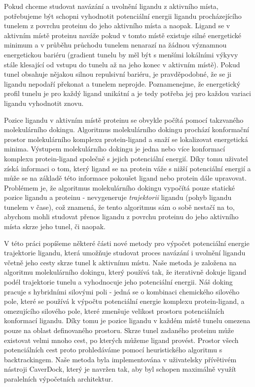 Pokud chceme studovat navázání a uvolnění ligandu z aktivního místa, potřebujeme
být schopni vyhodnotit potenciální energii ligandu procházejícího tunelem
z povrchu proteinu do jeho aktivního místa a naopak. Ligand se v aktivním
místě proteinu naváže pokud v tomto místě existuje silné energetické minimum
a v průběhu průchodu tunelem nenarazí na žádnou významnou energetickou bariéru
(gradient tunelu by měl být s menšími lokálními výkyvy stále klesající od
vstupu do tunelu až na jeho konec v aktivním místě). Pokud tunel obsahuje nějakou
silnou repulsivní bariéru, je pravděpodobné, že se ji ligandu nepodaří překonat
a tunelem neprojde. Poznamenejme, že energetický profil tunelu je pro každý
ligand unikátní a je tedy potřeba jej pro každou variaci ligandu vyhodnotit
znovu.

Pozice ligandu v aktivním místě proteinu se obvykle počítá pomocí takzvaného
molekulárního dokingu. Algoritmus molekulárního dokingu prochází konformační
prostor molekulárního komplexu protein-ligand a snaží se lokalizovat energetická
minima. Výstupem molekulárního dokingu je jedna nebo více konformací komplexu protein-ligand
společně s jejich potenciální energií. Díky tomu
uživatel získá informaci o tom, který ligand se na protein váže s nižší potenciální
energií a může se na základě této informace pokoušet ligand nebo protein
dále upravovat. Problémem je, že algoritmus molekulárního dokingu vypočítá pouze
statické pozice ligandu a proteinu - nevygeneruje \textit{trajektorii} ligandu
(pohyb ligandu tunelem v čase), což znamená, že tento algoritmus sám o sobě
nestačí na to, abychom mohli studovat přenos ligandu z povrchu proteinu
do jeho aktivního místa skrze jeho tunel, či naopak.

V této práci popíšeme některé části nové metody pro výpočet potenciální energie
trajektorie ligandu, která umožňuje studovat proces navázání i uvolnění ligandu
včetně jeho cesty skrze tunel k aktivnímu místu. Naše metoda je založena na
algoritmu molekulárního dokingu, který používá tak, že iterativně dokuje ligand
podél trajektorie tunelu a vyhodnocuje jeho potenciální energii. Náš doking
pracuje s hybridními silovými poli - jedná se o kombinaci chemického silového
pole, které se používá k výpočtu potenciální energie komplexu protein-ligand,
a omezujícího silového pole, které zmenšuje velikost prostoru potenciálních
konformací ligandu. Díky tomu je pozice ligandu v každém místě tunelu
omezena pouze na oblast definovaného prostoru. Skrze tunel zadaného proteinu
může existovat velmi mnoho cest, po kterých můžeme ligand provést. Prostor
všech potenciálních cest proto prohledáváme pomocí heuristického algoritmu
s backtrackingem. Naše metoda byla implementována v uživatelsky přívětivém
nástroji CaverDock, který je navržen tak, aby byl schopen maximálně využít
paralelních výpočetních architektur.

